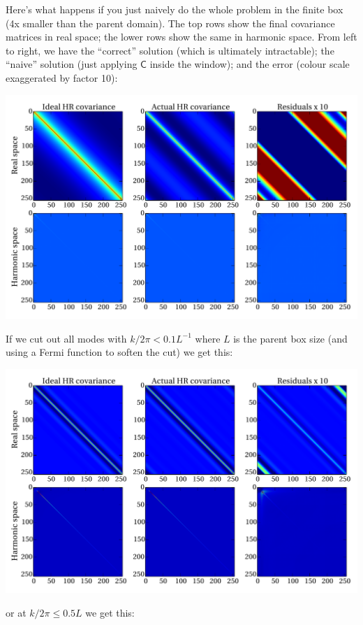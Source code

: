 \documentclass[11pt,a4paper,preprint]{aastex}
\begin{document}
Here's what happens if you just naively do the whole problem in the
finite box (4x smaller than the parent domain). The top rows show the
final covariance matrices in real space; the lower rows show the same
in harmonic space. From left to right, we have the ``correct''
solution (which is ultimately intractable); the ``naive'' solution
(just applying $\mathsf{C}$ inside the window); and the error (colour
scale exaggerated by factor 10):

\includegraphics[width=\textwidth]{figs/zoom_test1.pdf}

If we cut out all modes with $k/2\pi<0.1L^{-1}$ where $L$ is the
parent box size (and using a Fermi function to soften the cut) we get
this:

\includegraphics[width=\textwidth]{figs/zoom_test2.pdf}

or at $k/2\pi \le 0.5L$ we get this:
\end{document}
